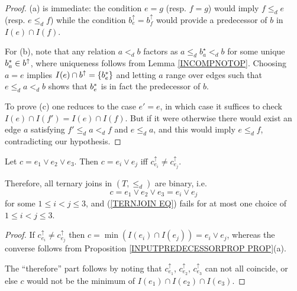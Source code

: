 \documentclass[a4paper,10pt]{article}%
\begin{document}
\begin{proof}
  (a) is immediate: the condition $e = g$ (resp. $f = g$) would imply $f \leq_d e$ (resp. $e \leq_d f$)
  while the condition $b^{\uparrow}_e = b^{\uparrow}_f$ would provide a predecessor of $b$ in $I(e) \cap I(f)$. 

  For (b), note that any relation $a <_d b$ factors as 
  $a \leq_d b^{\star}_a <_d b$ for some unique $b^{\**}_a \in b^{\uparrow}$, where uniqueness follows from Lemma \ref{INCOMPNOTOP}. Choosing $a=e$ implies $I(e) \cap b^{\uparrow} = \{b^{\**}_e\}$ and letting $a$ range over edges such that $e \leq_d a <_d b$ shows that $b^{\**}_e$ is in fact the predecessor of $b$.

  To prove (c) one reduces to the case $e'=e$, in which case it suffices to check $I(e) \cap I(f') = I(e) \cap I(f)$. But if it were otherwise there would exist an edge $a$ satisfying
  $f' \leq_d a <_d f$ and $e \leq_d a$, and this would imply $e \leq_d f$, contradicting our hypothesis.
\end{proof}



\begin{proposition}
  \label{TERNARYJOIN PROP}
  Let $c = e_1 \vee e_2 \vee e_3$.
  Then $c = e_i \vee e_j$ iff $c^{\uparrow}_{e_i} \neq c^{\uparrow}_{e_j}$.

  Therefore, all ternary joins in $(T,\leq_d)$ are binary, i.e.
  \begin{equation}\label{TERNJOIN EQ}
    c = e_1 \vee e_2 \vee e_3 = e_i \vee e_j
  \end{equation}
  for some $1\leq i <j \leq 3$, and
  (\ref{TERNJOIN EQ}) fails for 
  at most one choice of $1\leq i <j \leq 3$.
\end{proposition}


\begin{proof}
  If $c^{\uparrow}_{e_i} \neq c^{\uparrow}_{e_j}$ then
  $c = \min\left(I(e_i) \cap I(e_j)\right) = e_i \vee e_j$, whereas the converse follows from Proposition \ref{INPUTPREDECESSORPROP PROP}(a).

  The ``therefore'' part follows by noting that 
  $c^{\uparrow}_{e_1}$, $c^{\uparrow}_{e_2}$, $c^{\uparrow}_{e_3}$
  can not all coincide, or else $c$ would not be the minimum of
  $I(e_1) \cap I(e_2) \cap I(e_3)$. 
\end{proof}
\end{document}
